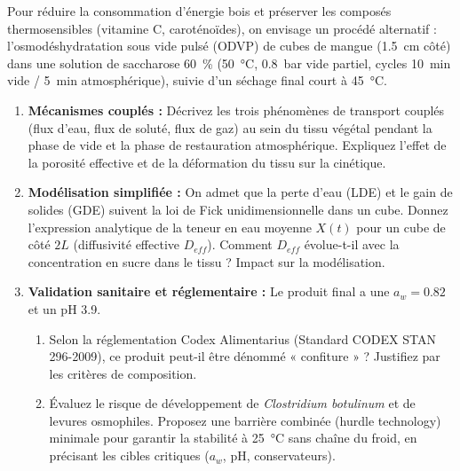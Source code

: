 \documentclass[11pt]{article}
\begin{document}
\begin{exercice}
Pour réduire la consommation d'énergie bois et préserver les composés thermosensibles (vitamine C, caroténoïdes), on envisage un procédé alternatif : l'osmodéshydratation sous vide pulsé (ODVP) de cubes de mangue (\SI{1.5}{cm} côté) dans une solution de saccharose \SI{60}{\%} (\SI{50}{\celsius}, \SI{0.8}{bar} vide partiel, cycles \SI{10}{min} vide / \SI{5}{min} atmosphérique), suivie d'un séchage final court à \SI{45}{\celsius}.

\begin{enumerate}
    \item \textbf{Mécanismes couplés :} Décrivez les trois phénomènes de transport couplés (flux d'eau, flux de soluté, flux de gaz) au sein du tissu végétal pendant la phase de vide et la phase de restauration atmosphérique. Expliquez l'effet de la porosité effective et de la déformation du tissu sur la cinétique.
    \item \textbf{Modélisation simplifiée :} On admet que la perte d'eau (LDE) et le gain de solides (GDE) suivent la loi de Fick unidimensionnelle dans un cube. Donnez l'expression analytique de la teneur en eau moyenne $X(t)$ pour un cube de côté $2L$ (diffusivité effective $D_{eff}$). Comment $D_{eff}$ évolue-t-il avec la concentration en sucre dans le tissu ? Impact sur la modélisation.
    \item \textbf{Validation sanitaire et réglementaire :} Le produit final a une $a_w = 0.82$ et un pH \SI{3.9}{}. 
    \begin{enumerate}
        \item Selon la réglementation Codex Alimentarius (Standard CODEX STAN 296-2009), ce produit peut-il être dénommé « confiture » ? Justifiez par les critères de composition.
        \item Évaluez le risque de développement de \textit{Clostridium botulinum} et de levures osmophiles. Proposez une barrière combinée (hurdle technology) minimale pour garantir la stabilité à \SI{25}{\celsius} sans chaîne du froid, en précisant les cibles critiques ($a_w$, pH, conservateurs).
    \end{enumerate}
\end{enumerate}
\end{exercice}
\end{document}
